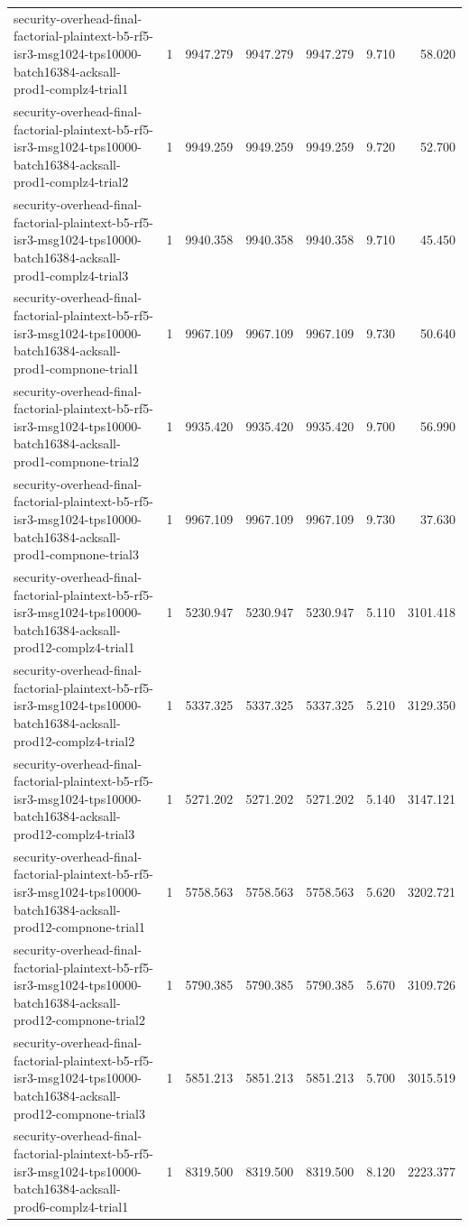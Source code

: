 \begin{tabular}{lrrrrrr}
security-overhead-final-factorial-plaintext-b5-rf5-isr3-msg1024-tps10000-batch16384-acksall-prod1-complz4-trial1 & 1 & 9947.279 & 9947.279 & 9947.279 & 9.710 & 58.020 \\
security-overhead-final-factorial-plaintext-b5-rf5-isr3-msg1024-tps10000-batch16384-acksall-prod1-complz4-trial2 & 1 & 9949.259 & 9949.259 & 9949.259 & 9.720 & 52.700 \\
security-overhead-final-factorial-plaintext-b5-rf5-isr3-msg1024-tps10000-batch16384-acksall-prod1-complz4-trial3 & 1 & 9940.358 & 9940.358 & 9940.358 & 9.710 & 45.450 \\
security-overhead-final-factorial-plaintext-b5-rf5-isr3-msg1024-tps10000-batch16384-acksall-prod1-compnone-trial1 & 1 & 9967.109 & 9967.109 & 9967.109 & 9.730 & 50.640 \\
security-overhead-final-factorial-plaintext-b5-rf5-isr3-msg1024-tps10000-batch16384-acksall-prod1-compnone-trial2 & 1 & 9935.420 & 9935.420 & 9935.420 & 9.700 & 56.990 \\
security-overhead-final-factorial-plaintext-b5-rf5-isr3-msg1024-tps10000-batch16384-acksall-prod1-compnone-trial3 & 1 & 9967.109 & 9967.109 & 9967.109 & 9.730 & 37.630 \\
security-overhead-final-factorial-plaintext-b5-rf5-isr3-msg1024-tps10000-batch16384-acksall-prod12-complz4-trial1 & 1 & 5230.947 & 5230.947 & 5230.947 & 5.110 & 3101.418 \\
security-overhead-final-factorial-plaintext-b5-rf5-isr3-msg1024-tps10000-batch16384-acksall-prod12-complz4-trial2 & 1 & 5337.325 & 5337.325 & 5337.325 & 5.210 & 3129.350 \\
security-overhead-final-factorial-plaintext-b5-rf5-isr3-msg1024-tps10000-batch16384-acksall-prod12-complz4-trial3 & 1 & 5271.202 & 5271.202 & 5271.202 & 5.140 & 3147.121 \\
security-overhead-final-factorial-plaintext-b5-rf5-isr3-msg1024-tps10000-batch16384-acksall-prod12-compnone-trial1 & 1 & 5758.563 & 5758.563 & 5758.563 & 5.620 & 3202.721 \\
security-overhead-final-factorial-plaintext-b5-rf5-isr3-msg1024-tps10000-batch16384-acksall-prod12-compnone-trial2 & 1 & 5790.385 & 5790.385 & 5790.385 & 5.670 & 3109.726 \\
security-overhead-final-factorial-plaintext-b5-rf5-isr3-msg1024-tps10000-batch16384-acksall-prod12-compnone-trial3 & 1 & 5851.213 & 5851.213 & 5851.213 & 5.700 & 3015.519 \\
security-overhead-final-factorial-plaintext-b5-rf5-isr3-msg1024-tps10000-batch16384-acksall-prod6-complz4-trial1 & 1 & 8319.500 & 8319.500 & 8319.500 & 8.120 & 2223.377 \\

\end{tabular}
